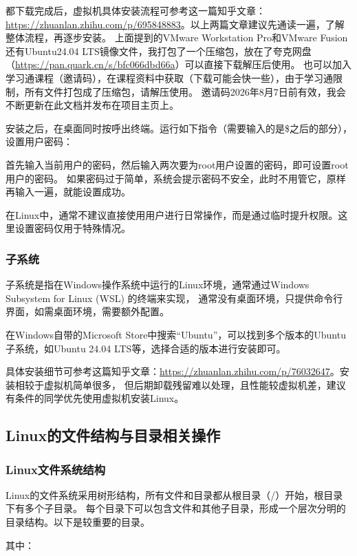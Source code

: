 都下载完成后，虚拟机具体安装流程可参考这一篇知乎文章：\url{https://zhuanlan.zhihu.com/p/695848883}。以上两篇文章建议先通读一遍，了解整体流程，再逐步安装。
上面提到的VMware Workstation Pro和VMware Fusion还有Ubuntu24.04 LTS镜像文件，我打包了一个压缩包，放在了夸克网盘（\url{https://pan.quark.cn/s/bfc066dbd66a}）可以直接下载解压后使用。
也可以加入学习通课程（邀请码），在课程资料中获取（下载可能会快一些），由于学习通限制，所有文件打包成了压缩包，请解压使用。
邀请码2026年8月7日前有效，我会不断更新在此文档并发布在项目主页上。

安装之后，在桌面同时按呼出终端。运行如下指令（需要输入的是\$之后的部分），设置用户密码：

首先输入当前用户的密码，然后输入两次要为root用户设置的密码，即可设置root用户的密码。
如果密码过于简单，系统会提示密码不安全，此时不用管它，原样再输入一遍，就能设置成功。

在Linux中，通常不建议直接使用用户进行日常操作，而是通过临时提升权限。这里设置密码仅用于特殊情况。

\subsubsection{子系统}
子系统是指在Windows操作系统中运行的Linux环境，通常通过Windows Subsystem for Linux (WSL) 的终端来实现，
通常没有桌面环境，只提供命令行界面，如需桌面环境，需要额外配置。

在Windows自带的Microsoft Store中搜索“Ubuntu”，可以找到多个版本的Ubuntu子系统，如Ubuntu 24.04 LTS等，选择合适的版本进行安装即可。

具体安装细节可参考这篇知乎文章：\url{https://zhuanlan.zhihu.com/p/76032647}。安装相较于虚拟机简单很多，
但后期卸载残留难以处理，且性能较虚拟机差，建议有条件的同学优先使用虚拟机安装Linux。

\subsection{Linux的文件结构与目录相关操作}

\subsubsection{Linux文件系统结构}
Linux的文件系统采用树形结构，所有文件和目录都从根目录（/）开始，根目录下有多个子目录。
每个目录下可以包含文件和其他子目录，形成一个层次分明的目录结构。以下是较重要的目录。
\begin{center}
\begin{minipage}{0.8\textwidth}
\end{minipage}
\end{center}
其中：

